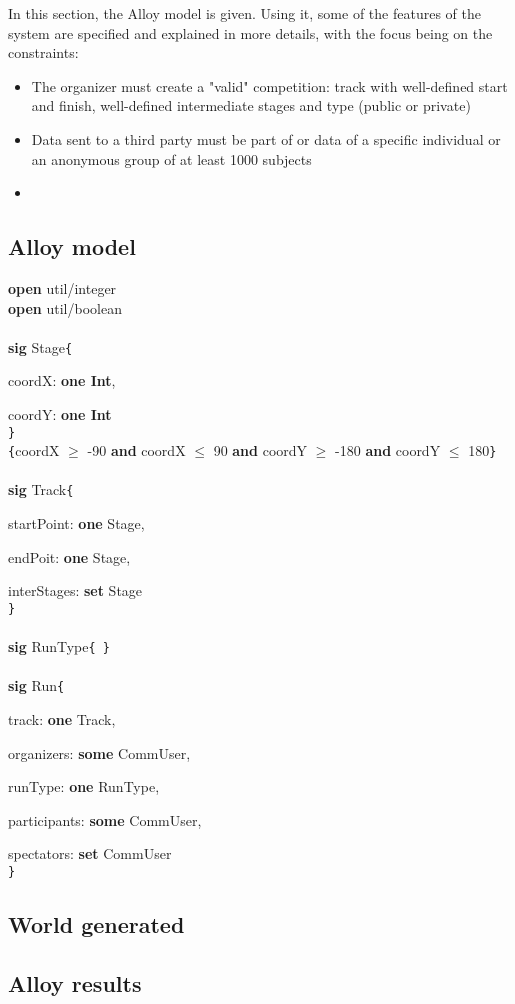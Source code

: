 
%
In this section, the Alloy model is given. Using it, some of the features of the system are specified and explained in more details, with the focus being on the constraints:
\begin{itemize}
\item The organizer must create a "valid" competition: track with well-defined start and finish, well-defined intermediate stages and type (public or private)
\item Data sent to a third party must be part of or data of a specific individual or an anonymous group of at least 1000 subjects
\item %
\end{itemize}

\subsection{Alloy model}
\textbf{open} util/integer\\
\textbf{open} util/boolean\\
\\
\textbf{sig} Stage\verb|{|

coordX: \textbf{one Int},

coordY: \textbf{one Int}\\
\verb|}|\\
\verb|{|coordX $\geq$ -90 \textbf{and} coordX $\leq$ 90 \textbf{and} coordY $\geq$ -180 \textbf{and} coordY $\leq$ 180\verb|}|\\
\\
\textbf{sig} Track\verb|{|

startPoint: \textbf{one} Stage,

endPoit: \textbf{one} Stage,

interStages: \textbf{set} Stage\\
\verb|}|\\
\\
\textbf{sig} RunType\verb|{ }|\\
\\
\textbf{sig} Run\verb|{|

track: \textbf{one} Track,

organizers: \textbf{some} CommUser,

runType: \textbf{one} RunType,

participants: \textbf{some} CommUser,

spectators: \textbf{set} CommUser\\
\verb|}|\\

\subsection{World generated}

\subsection{Alloy results}



%